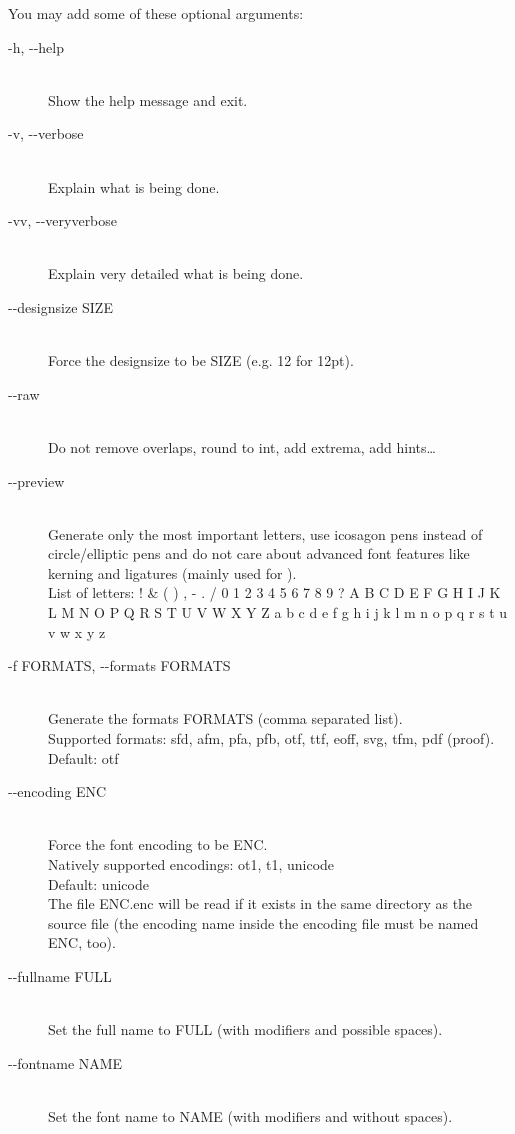 \documentclass{scrartcl}
\begin{document}
You may add some of these optional arguments:
\begin{description}
	\item[-h, -{}-help] \hfill \\
		Show the help message and exit.
	\item[-v, -{}-verbose ] \hfill \\
		Explain what is being done.
	\item[-vv, -{}-veryverbose] \hfill \\
		Explain very detailed what is being done.
	\item[-{}-designsize SIZE] \hfill \\
		Force the designsize to be SIZE (e.g. 12 for 12pt).
	\item[-{}-raw] \hfill \\
		Do not remove overlaps, round to int, add extrema, add hints\ldots
	\item[-{}-preview  ] \hfill \\
		Generate only the most important letters, use icosagon pens instead of circle/elliptic pens and do not care about advanced font features like kerning and ligatures (mainly used for ).\\
		List of letters: ! \& ( ) , - . / 0 1 2 3 4 5 6 7 8 9 ? A B C D E F G H I J K L M N O P Q R S T U V W X Y Z a b c d e f g h i j k l m n o p q r s t u v w x y z 
	\item[-f FORMATS, -{}-formats FORMATS] \hfill \\
		Generate the formats FORMATS (comma separated list).\\
		Supported formats: sfd, afm, pfa, pfb, otf, ttf, eoff, 
		svg, tfm, pdf (proof).\\
		Default: otf
	\item[-{}-encoding ENC ] \hfill \\
		Force the font encoding to be ENC.\\
		Natively supported encodings: ot1, t1, unicode\\
		Default: unicode\\
		The file ENC.enc will be read if it exists in the same directory as the source file (the encoding name inside the encoding file must be named ENC, too).
	\item[-{}-fullname FULL] \hfill \\
		Set the full name to FULL (with modifiers and possible spaces).
	\item[-{}-fontname NAME] \hfill \\
		Set the font name to NAME (with modifiers and without spaces).

\end{description}
\end{document}
